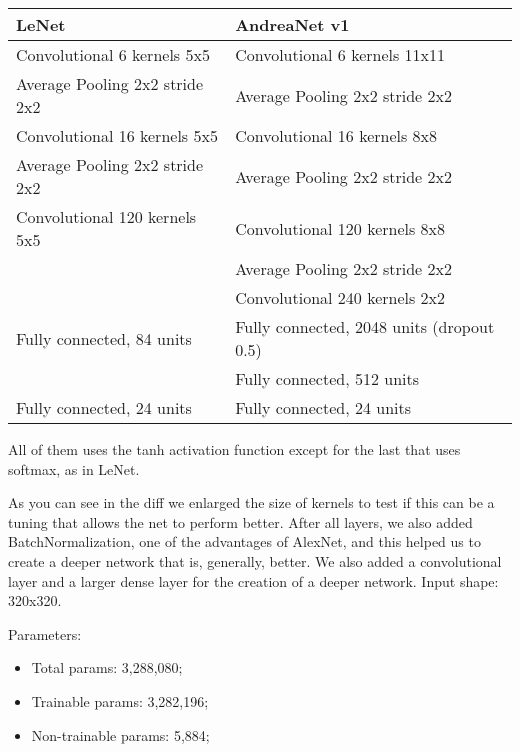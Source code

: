 \documentclass[paper=a4, fontsize=11pt]{scrartcl} %
\numberwithin{equation}{section} %
\numberwithin{figure}{section} %
\numberwithin{table}{section} %
\begin{document}
\bigskip
\begin{tabular}{ | l | l | }
    \hline
    \textbf{LeNet} & \textbf{AndreaNet v1} \\ \hline
    Convolutional 6 kernels 5x5 & Convolutional 6 kernels 11x11 \\ \hline 
    Average Pooling 2x2 stride 2x2 & Average Pooling 2x2 stride 2x2 \\ \hline 
    Convolutional 16 kernels 5x5 & Convolutional 16 kernels 8x8 \\ \hline 
    Average Pooling 2x2 stride 2x2 & Average Pooling 2x2 stride 2x2 \\ \hline
    Convolutional 120 kernels 5x5 & Convolutional 120 kernels 8x8 \\ \hline
    & Average Pooling 2x2 stride 2x2 \\ \hline     
    & Convolutional 240 kernels 2x2 \\ \hline 
    Fully connected, 84 units & Fully connected, 2048 units (dropout 0.5) \\ \hline 
    & Fully connected, 512 units \\ \hline 
    Fully connected, 24 units & Fully connected, 24 units \\ \hline 
\end{tabular}
\bigskip

All of them uses the tanh activation function except for the last that uses softmax, as in LeNet.

As you can see in the diff we enlarged the size of kernels to test if this can be a tuning that allows the net to perform better.
After all layers, we also added BatchNormalization, one of the advantages of AlexNet, and this helped us to create a deeper network that is, generally, better.
We also added a convolutional layer and a larger dense layer for the creation of a deeper network.
\bigskip
Input shape: 320x320.

Parameters:
\begin{itemize}
    \item Total params: 3,288,080;
    \item Trainable params: 3,282,196;
    \item Non-trainable params: 5,884;
\end{itemize}
\end{document}
